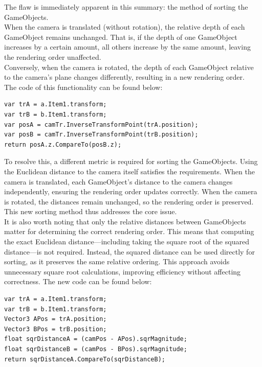 \documentclass[12pt]{article}
\begin{document}
The flaw is immediately apparent in this summary: the method of sorting the GameObjects.\\
When the camera is translated (without rotation), the relative depth of each GameObject remains unchanged. That is, if the depth of one GameObject increases by a certain amount, all others increase by the same amount, leaving the rendering order unaffected.\\
Conversely, when the camera is rotated, the depth of each GameObject relative to the camera’s plane changes differently, resulting in a new rendering order.\\
The code of this functionality can be found below:
\begin{lstlisting}[tabsize=2,caption=The sort key used to determine the rendering order, label=code:sort_original,breaklines=true,breakatwhitespace=true,basicstyle=\ttfamily\footnotesize]
var trA = a.Item1.transform;
var trB = b.Item1.transform;
var posA = camTr.InverseTransformPoint(trA.position);
var posB = camTr.InverseTransformPoint(trB.position);
return posA.z.CompareTo(posB.z);
\end{lstlisting}
To resolve this, a different metric is required for sorting the GameObjects. Using the Euclidean distance to the camera itself satisfies the requirements. When the camera is translated, each GameObject’s distance to the camera changes independently, ensuring the rendering order updates correctly. When the camera is rotated, the distances remain unchanged, so the rendering order is preserved. This new sorting method thus addresses the core issue.\\
It is also worth noting that only the relative distances between GameObjects matter for determining the correct rendering order. This means that computing the exact Euclidean distance—including taking the square root of the squared distance—is not required. Instead, the squared distance can be used directly for sorting, as it preserves the same relative ordering. This approach avoids unnecessary square root calculations, improving efficiency without affecting correctness.
The new code can be found below:
\begin{lstlisting}[tabsize=2,caption=The newly implemented sort key to determine the rendering order, label=code:sort_pos,breaklines=true,breakatwhitespace=true,basicstyle=\ttfamily\footnotesize]
var trA = a.Item1.transform;
var trB = b.Item1.transform;
Vector3 APos = trA.position;
Vector3 BPos = trB.position;
float sqrDistanceA = (camPos - APos).sqrMagnitude;
float sqrDistanceB = (camPos - BPos).sqrMagnitude;
return sqrDistanceA.CompareTo(sqrDistanceB);
\end{lstlisting}
\end{document}
